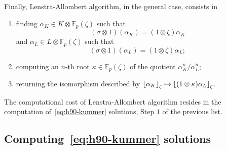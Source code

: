 Finally, Lenstra-Allombert algorithm, in the general case, consists in
\begin{enumerate}
  \item finding $\alpha_K\in K\otimes\mathbb{F}_p(\zeta)$ such that
    \[
      (\sigma\otimes1)(\alpha_K)=(1\otimes\zeta)\alpha_K
    \]
    and $\alpha_L\in L\otimes\mathbb{F}_p(\zeta)$ such that
    \[
      (\sigma\otimes1)(\alpha_L)=(1\otimes\zeta)\alpha_L;
    \]
  \item computing an $n$-th root $\kappa\in\mathbb{F}_p(\zeta)$ of the quotient
    $\alpha_K^n/\alpha_L^n$;
  \item returning the isomorphism described by
    $\left\lfloor \alpha_K \right\rfloor_{\zeta}\mapsto\left\lfloor (1\otimes\kappa)\alpha_L \right\rfloor_{\zeta}$.
\end{enumerate}
The computational cost of Lenstra-Allombert algorithm resides in the computation
of~\eqref{eq:h90-kummer} solutions, \ie Step $1$ of the previous list.

\subsection{Computing~\eqref{eq:h90-kummer} solutions}
\label{sec:computing-h90}

